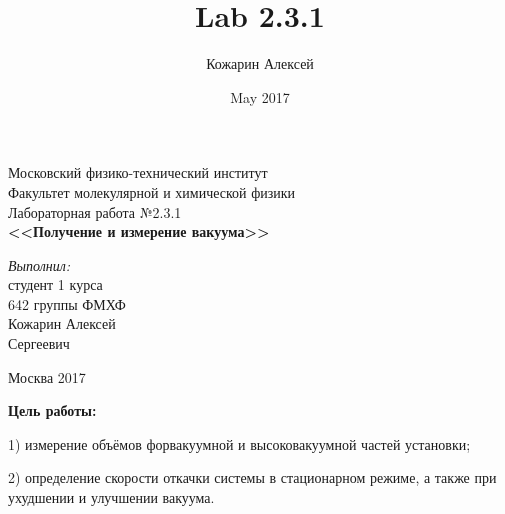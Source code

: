 \documentclass[a4paper,12pt]{article}
\title{Lab 2.3.1}
\author{Кожарин Алексей}
\date{May 2017}
\begin{document}
\begin{titlepage}
	\begin{center} 
		
		\large Московский физико-технический институт\\
		Факультет молекулярной и химической физики\\
		\vspace{7cm}
		\huge Лабораторная работа №2.3.1\\
		\textbf{\Large <<Получение и измерение вакуума>>}\\
	\end{center} 
	
	\vspace{7.5cm}
	{\par \raggedleft \large \emph{Выполнил:}\\ студент 1 курса\\ 642 группы ФМХФ\\ Кожарин Алексей\\ Сергеевич  \par}
	\begin{center}
		\vfill Москва 2017
	\end{center}
\end{titlepage}
\newpage
\setcounter{page}{2}

\begin{center}
\end{center}
\hspace{0.2cm}\textbf{Цель работы:}
\par 1) измерение объёмов форвакуумной и высоковакуумной частей установки;
\par 2) определение скорости откачки системы в стационарном режиме, а также при ухудшении и 
улучшении вакуума.
\end{document}
